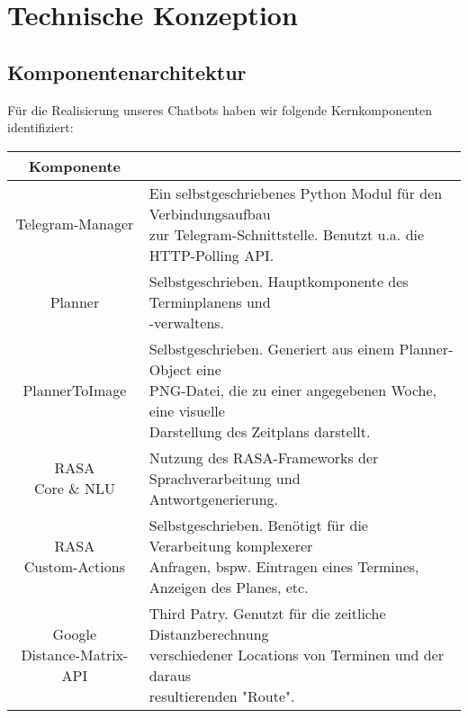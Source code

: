 \chapter{Technische Konzeption}

\section{Komponentenarchitektur}
Für die Realisierung unseres Chatbots haben wir folgende Kernkomponenten identifiziert:


\begin{center}
	\begin{tabular}{c|l}
		\textbf{Komponente} & \makecell[c]{\textbf{Beschreibung}} \\\hline
		Telegram-Manager & \makecell[l]{Ein selbstgeschriebenes Python Modul für den Verbindungsaufbau\\zur Telegram-Schnittstelle. Benutzt u.a. die HTTP-Polling API.} \\\hline
		Planner & \makecell[l]{Selbstgeschrieben. Hauptkomponente des Terminplanens und\\-verwaltens.} \\\hline
		PlannerToImage & \makecell[l]{Selbstgeschrieben. Generiert aus einem Planner-Object eine\\PNG-Datei, die zu einer angegebenen Woche, eine visuelle\\Darstellung des Zeitplans darstellt.} \\\hline
		\makecell[c]{RASA\\Core \& NLU} & \makecell[l]{Nutzung des RASA-Frameworks der Sprachverarbeitung und\\Antwortgenerierung.}\\\hline
		\makecell[c]{RASA\\Custom-Actions} & \makecell[l]{Selbstgeschrieben. Benötigt für die Verarbeitung komplexerer\\Anfragen, bspw. Eintragen eines Termines, Anzeigen des Planes, etc.}\\\hline
		\makecell[c]{Google\\Distance-Matrix-API} & \makecell[l]{Third Patry. Genutzt für die zeitliche Distanzberechnung\\verschiedener Locations von Terminen und der daraus\\resultierenden "Route".}
	\end{tabular}
\end{center}


